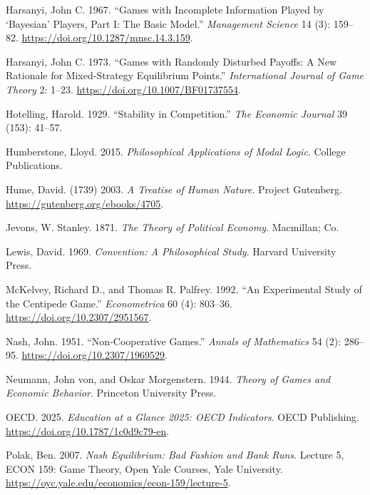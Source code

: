 \documentclass[
  11pt,
  letterpaper,
]{scrbook}
\newlength{\cslhangindent}
\newenvironment{CSLReferences}[2] %
 {\begin{list}{}{%
  \setlength{\itemindent}{0pt}
  \setlength{\leftmargin}{0pt}
  \setlength{\parsep}{0pt}
  \ifodd #1
   \setlength{\leftmargin}{\cslhangindent}
   \setlength{\itemindent}{-1\cslhangindent}
  \fi
  \setlength{\itemsep}{#2\baselineskip}}}
 {\end{list}}
\begin{document}
\begin{CSLReferences}{1}{1}
Harsanyi, John C. 1967. {``Games with Incomplete Information Played by
{`{B}ayesian'} Players, {P}art {I}: The Basic Model.''} \emph{Management
Science} 14 (3): 159--82. \url{https://doi.org/10.1287/mnsc.14.3.159}.

Harsanyi, John C. 1973. {``Games with Randomly Disturbed Payoffs: A New
Rationale for Mixed-Strategy Equilibrium Points.''} \emph{International
Journal of Game Theory} 2: 1--23.
\url{https://doi.org/10.1007/BF01737554}.

Hotelling, Harold. 1929. {``Stability in Competition.''} \emph{The
Economic Journal} 39 (153): 41--57.

Humberstone, Lloyd. 2015. \emph{Philosophical Applications of Modal
Logic}. College {P}ublications.

Hume, David. (1739) 2003. \emph{A Treatise of Human Nature}. Project
Gutenberg. \url{https://gutenberg.org/ebooks/4705}.

Jevons, W. Stanley. 1871. \emph{The Theory of Political Economy}.
Macmillan; Co.

Lewis, David. 1969. \emph{Convention: A Philosophical Study}. Harvard
University Press.

McKelvey, Richard D., and Thomas R. Palfrey. 1992. {``An Experimental
Study of the Centipede Game.''} \emph{Econometrica} 60 (4): 803--36.
\url{https://doi.org/10.2307/2951567}.

Nash, John. 1951. {``Non-Cooperative Games.''} \emph{Annals of
Mathematics} 54 (2): 286--95. \url{https://doi.org/10.2307/1969529}.

Neumann, John von, and Oskar Morgenstern. 1944. \emph{Theory of Games
and Economic Behavior}. Princeton University Press.

OECD. 2025. \emph{Education at a Glance 2025: {OECD} Indicators}. OECD
Publishing. \url{https://doi.org/10.1787/1c0d9c79-en}.

Polak, Ben. 2007. \emph{Nash Equilibrium: Bad Fashion and Bank Runs}.
Lecture 5, ECON 159: Game Theory, Open Yale Courses, Yale University.
\url{https://oyc.yale.edu/economics/econ-159/lecture-5}.


\end{CSLReferences}
\end{document}
